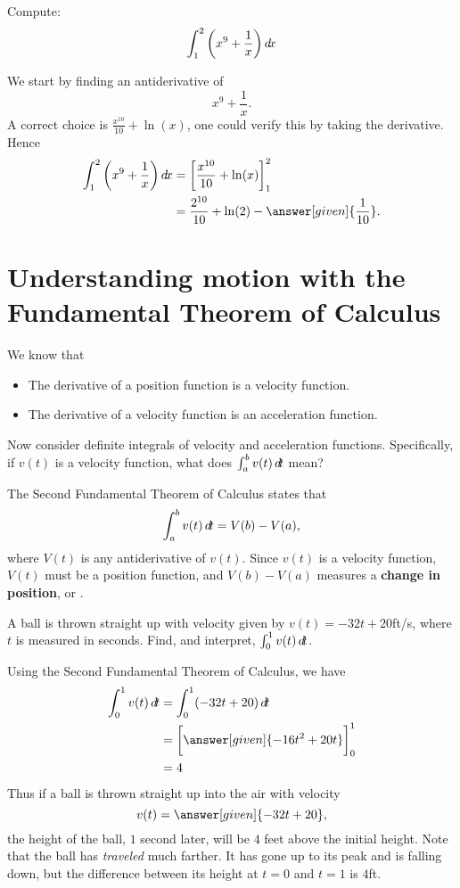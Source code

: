 \documentclass{ximera}
\begin{document}
\begin{example}
Compute:
\[
\int_1^2\left(x^9 + \frac{1}{x}\right) \mathop{}\!d\! x
\]
\begin{explanation}
We start by finding an antiderivative of
\[
x^9 + \frac{1}{x}.
\]
A correct choice is $\frac{x^{10}}{10} + \ln(x)$, one could verify
this by taking the derivative. Hence
\begin{align*}
\int_1^2\left(x^9 + \frac{1}{x}\right) \d x &= \eval{\frac{x^{10}}{10} + \ln(x)}_1^2 \\
&= \frac{2^{10}}{10} + \ln(2) - \answer[given]{\frac{1}{10}}.
\end{align*}
\end{explanation}
\end{example}




\section{Understanding motion with the Fundamental Theorem of Calculus}

We know that
\begin{itemize}
\item The derivative of a position function is a velocity function.
\item The derivative of a velocity function is an acceleration
  function.
\end{itemize}
Now consider definite integrals of velocity and acceleration
functions. Specifically, if $v(t)$ is a velocity function, what does
$\int_a^b v(t)\mathop{}\!d\! t$ mean?

The Second Fundamental Theorem of Calculus states that
\[
\int_a^b v(t)\mathop{}\!d\! t = V(b) - V(a),
\]
where $V(t)$ is any antiderivative of $v(t)$. Since $v(t)$ is a
velocity function, $V(t)$ must be a position function, and $V(b) -
V(a)$ measures a \textbf{change in position}, or .

\begin{example}
  A ball is thrown straight up with velocity given by $v(t) =
  -32t+20$ft/s, where $t$ is measured in seconds. Find, and interpret,
  $\int_0^1 v(t)\mathop{}\!d\! t$.
    \begin{explanation}
      Using the Second Fundamental Theorem of Calculus, we have
      \begin{align*}
        \int_0^1 v(t)\d t &= \int_0^1 (-32t+20)\d t \\
	&= \eval{\answer[given]{-16t^2 + 20t}}_0^1 \\
	&= 4
      \end{align*}
      Thus if a ball is thrown straight up into the air with velocity
      \[
      v(t) = \answer[given]{-32t+20},
      \]
      the height of the ball, $1$ second later, will be $4$ feet above the
      initial height. Note that the ball has \textit{traveled} much
      farther. It has gone up to its peak and is falling down, but the
      difference between its height at $t=0$ and $t=1$ is $4$ft. 
    \end{explanation}
\end{example}    
\end{document}
